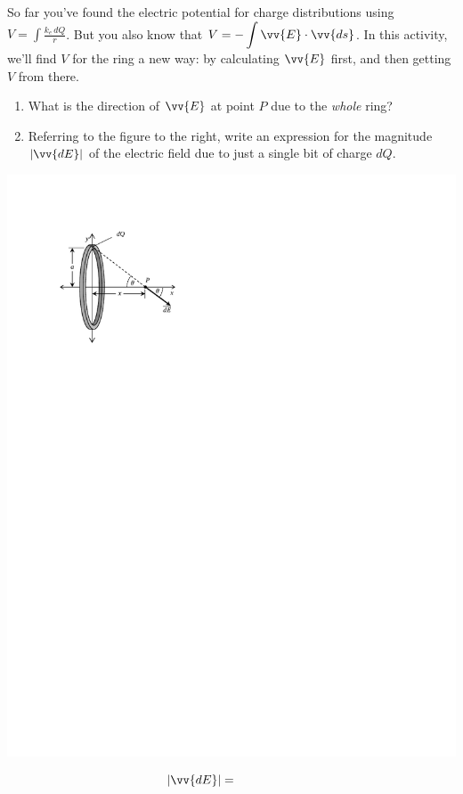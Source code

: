 \begin{minipage}{0.60\textwidth}
So far you've found the electric potential for charge distributions using 
$\displaystyle V=\int{\frac{k_e\,dQ}{r}}$.  
But you also know that 
$\displaystyle V=-\int{\vv{E} \cdot \vv{ds}}$.  
In this activity, we'll find $V$ for the ring a new way: by calculating $\vv{E}$ first, and then getting $V$ from there.

\begin{enumerate}[labparts]

\item What is the direction of $\vv{E}$ at point $P$ due to the \textit{whole} ring?
\answerspace{0.3in}

\item Referring to the figure to the right, write an expression for the magnitude $| \vv{dE} |$ of the electric field due to just a single bit of charge $dQ$.

\end{enumerate}
\end{minipage}
\begin{minipage}{0.39\textwidth}
\vspace{-0.3in}
\raggedleft \includegraphics[scale=1.0]{potential_charge_distributions/ring_E_field.pdf}
\end{minipage}
$$| \vv{dE}|=\hspace{0.7in}$$
\answerspace{0.1in}

